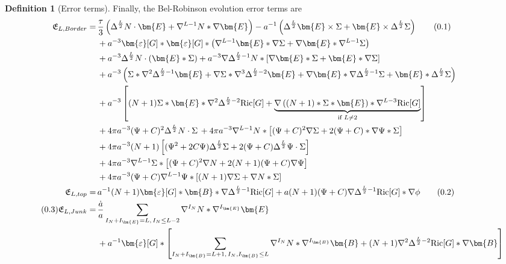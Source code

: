 \documentclass[11pt,leqno,textwidth=10cm]{amsart}
\numberwithin{equation}{section}
\theoremstyle{definition}
\newtheorem{definition}{Definition}[section]
\theoremstyle{plain}
\newcommand{\1}{\mathbbm{1}}
\newcommand{\Ric}{\text{\normalfont{Ric}}}
\renewcommand{\epsilon}{\varepsilon}
\newcommand{\Lap}{\Delta}
\newcommand{\numberthis}{\addtocounter{equation}{1}\tag{\theequation}}
\renewcommand{\theequation}{\arabic{section}.\arabic{equation}}
\newcommand{\RE}{\bm{E}}
\newcommand{\RB}{\bm{B}}
\newcommand{\epsilonLC}{\bm{\epsilon}}
\begin{document}
\begin{definition}[Error terms]
Finally, the Bel-Robinson evolution error terms are
{\scriptsize
\begin{subequations}
\begin{align*}
\mathfrak{E}_{L,Border}=&\,\frac{\tau}3\left(\Lap^{\frac{L}2}N\cdot\RE+\nabla^{L-1}N\ast\nabla\RE\right)-a^{-1}\left(\Lap^\frac{L}2\RE\times\Sigma+\RE\times\Lap^{\frac{L}2}\Sigma\right)\numberthis\label{eq:comeq-RE-border}\\
&\,+a^{-3}\epsilonLC[G]\ast\epsilonLC[G]\ast\left(\nabla^{L-1}\RE\ast\nabla\Sigma+\nabla\RE\ast\nabla^{L-1}\Sigma\right)\\
&\,+a^{-3}\Lap^{\frac{L}2}N\cdot(\RE\ast\Sigma)+a^{-3}\nabla\Lap^{\frac{L}2-1}N\ast[\nabla\RE\ast\Sigma+\RE\ast\nabla\Sigma]\\
&\,+a^{-3}\left(\Sigma\ast\nabla^2\Lap^{\frac{L}2-1}\RE+\nabla\Sigma\ast\nabla^3\Lap^{\frac{L}2-2}\RE+\nabla\RE\ast\nabla\Lap^{\frac{L}2-1}\Sigma+\RE\ast\Lap^{\frac{L}2}\Sigma\right)\\
&\,+a^{-3}\left[(N+1)\Sigma\ast\RE\ast\nabla^2\Lap^{\frac{L}2-2}\Ric[G]+\underbrace{\nabla\left((N+1)\ast\Sigma\ast\RE\right)\ast\nabla^{L-3}\Ric[G]}_{\text{if }L\neq 2}\right]\\
&\,+4\pi a^{-3}(\Psi+C)^2\Lap^\frac{L}2N\cdot\Sigma\,+4\pi a^{-3}\nabla^{L-1}N\ast\left[(\Psi+C)^2\nabla\Sigma+2(\Psi+C)\ast\nabla\Psi\ast\Sigma\right]\\
&\,+4\pi a^{-3}(N+1)\left[(\Psi^2+2C\Psi)\Lap^\frac{L}2\Sigma+2(\Psi+C)\Lap^\frac{L}2\Psi\cdot\Sigma\right]\\
&\,+4\pi a^{-3}\nabla^{L-1}\Sigma\ast\left[(\Psi+C)^2\nabla N+2(N+1)(\Psi+C)\nabla\Psi\right]\\
&\,+4\pi a^{-3}(\Psi+C)\nabla^{L-1}\Psi\ast\left[(N+1)\nabla\Sigma+\nabla N\ast\Sigma\right]\\
\mathfrak{E}_{L,top}=&\,a^{-1}(N+1)\epsilonLC[G]\ast \RB\ast\nabla\Lap^{\frac{L}2-1}\Ric[G]+a(N+1)(\Psi+C)\nabla\Lap^{\frac{L}2-1}\Ric[G]\ast\nabla\phi \numberthis\label{eq:comeq-RE-top}\\
\numberthis\label{eq:comeq-RE-junk}\mathfrak{E}_{L,Junk}=&\,\frac{\dot{a}}a\sum_{I_N+I_{\RE}=L,\,I_{N}\leq L-2}\nabla^{I_N}N\ast\nabla^{I_{\RE}}\RE\\
&\,+a^{-1}\epsilonLC[G]\ast\left[\sum_{I_N+I_{\RB}=L+1,\,I_{N},I_{\RB}\leq L}\nabla^{I_N}N\ast\nabla^{I_{\RB}}\RB+(N+1)\nabla^2\Lap^{\frac{L}2-2}\Ric[G]\ast\nabla\RB\right] \\

\end{align*}
\end{subequations}}
\end{definition}
\end{document}
